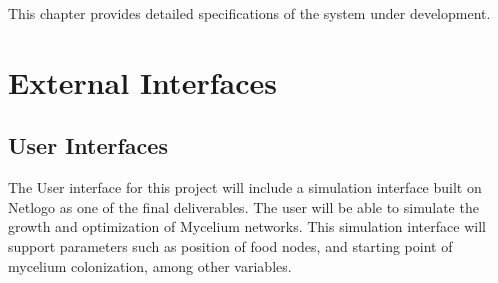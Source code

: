This chapter provides detailed specifications of the system under development.






\section{External Interfaces}


\subsection{User Interfaces}
The User interface for this project will include a simulation interface built on Netlogo as one of the final deliverables. The user will be able to simulate the growth and optimization of Mycelium networks. This simulation interface will support parameters such as position of food nodes, and starting point of mycelium colonization, among other variables.

